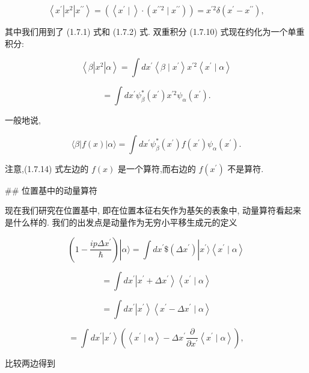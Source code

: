 \documentclass[lang=cn,newtx,10pt,scheme=chinese,thmcnt=section]{elegantbook}
\begin{document}
$$
\left\langle {{x}^{\prime }\left| {x}^{2}\right| {x}^{\prime \prime }}\right\rangle = \left( {\left\langle {{x}^{\prime } \mid }\right\rangle \cdot \left( {{x}^{\prime \prime 2} \mid {x}^{\prime \prime }}\right) }\right) = {x}^{\prime 2}\delta \left( {{x}^{\prime } - {x}^{\prime \prime }}\right) , \tag{1.7.12}
$$

其中我们用到了 (1.7.1) 式和 (1.7.2) 式. 双重积分 (1.7.10) 式现在约化为一个单重积分:

$$
\left\langle {\beta \left| {x}^{2}\right| \alpha }\right\rangle = \int d{x}^{\prime }\left\langle {\beta \mid {x}^{\prime }}\right\rangle {x}^{\prime 2}\left\langle {{x}^{\prime } \mid \alpha }\right\rangle \tag{1.7.13}
$$

$$
= \int d{x}^{\prime }{\psi }_{\beta }^{ * }\left( {x}^{\prime }\right) {x}^{\prime 2}{\psi }_{\alpha }\left( {x}^{\prime }\right) .
$$

一般地说,

$$
\langle \beta \left| {f\left( x\right) }\right| \alpha \rangle = \int d{x}^{\prime }{\psi }_{\beta }^{ * }\left( {x}^{\prime }\right) f\left( {x}^{\prime }\right) {\psi }_{\alpha }\left( {x}^{\prime }\right) . \tag{1.7.14}
$$

注意,(1.7.14) 式左边的 $f\left( x\right)$ 是一个算符,而右边的 $f\left( {x}^{\prime }\right)$ 不是算符.

## 位置基中的动量算符

现在我们研究在位置基中, 即在位置本征右矢作为基矢的表象中, 动量算符看起来是什么样的. 我们的出发点是动量作为无穷小平移生成元的定义

$$
\left( {1 - \frac{{ip\Delta }{x}^{\prime }}{\hbar }}\right) \left| {\alpha \rangle = \int d{x}^{\prime }\$ \left( {\Delta {x}^{\prime }}\right) }\right| {x}^{\prime }\rangle \left\langle {{x}^{\prime } \mid \alpha }\right\rangle
$$

$$
= \int d{x}^{\prime }\left| {{x}^{\prime } + \Delta {x}^{\prime }}\right\rangle \left\langle {{x}^{\prime } \mid \alpha }\right\rangle \tag{1.7.15}
$$

$$
= \int d{x}^{\prime }\left| {x}^{\prime }\right\rangle \left\langle {{x}^{\prime } - \Delta {x}^{\prime } \mid \alpha }\right\rangle
$$

$$
= \int d{x}^{\prime }\left| {x}^{\prime }\right\rangle \left( {\left\langle {{x}^{\prime } \mid \alpha }\right\rangle - \Delta {x}^{\prime }\frac{\partial }{\partial {x}^{\prime }}\left\langle {{x}^{\prime } \mid \alpha }\right\rangle }\right) ,
$$

比较两边得到
\end{document}
